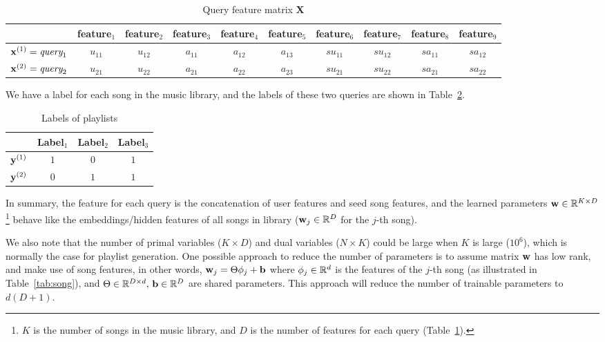 \begin{table}[h!]
\centering
\begin{tabular}{l|cc|ccccccc} \hline \hline
& feature$_1$ & feature$_2$ & feature$_3$ & feature$_4$ & feature$_5$ & feature$_6$ & feature$_7$ & feature$_8$ & feature$_9$ \\ \hline
$\mathbf{x}^{({1})} = \textit{query}_1$
& $u_{11}$ & $u_{12}$ 
& $a_{11}$ & $a_{12}$ & $a_{13}$ & $su_{11}$ & $su_{12}$ & $sa_{11}$ & $sa_{12}$ \\
$\mathbf{x}^{({2})} = \textit{query}_2$ 
& $u_{21}$ & $u_{22}$ 
& $a_{21}$ & $a_{22}$ & $a_{23}$ & $su_{21}$ & $su_{22}$ & $sa_{21}$ & $sa_{22}$ \\ \hline
\end{tabular}
\caption{Query feature matrix $\mathbf{X}$}
\label{tab:trainx}
\end{table}

We have a label for each song in the music library, and the labels of these two queries are shown in Table~\ref{tab:trainy}.

\begin{table}[h!]
\centering
\begin{tabular}{l|ccc} \hline \hline
& Label$_1$ & Label$_2$ & Label$_3$ \\ \hline
$\mathbf{y}^{({1})}$ & $1$ & $0$ & $1$ \\
$\mathbf{y}^{({2})}$ & $0$ & $1$ & $1$ \\ \hline
\end{tabular}
\caption{Labels of playlists}
\label{tab:trainy}
\end{table}


In summary, the feature for each query is the concatenation of user features and seed song features,
and the learned parameters $\mathbf{w} \in \mathbb{R}^{K \times D}$\footnote{
$K$ is the number of songs in the music library, and $D$ is the number of features for each query (Table~\ref{tab:trainx}).} 
behave like the embeddings/hidden features of all songs in library ($\mathbf{w}_j \in \mathbb{R}^D$ for the $j$-th song).

We also note that the number of primal variables ($K \times D$) and dual variables ($N \times K$) could be large when
$K$ is large (\eg $10^6$), which is normally the case for playlist generation.
One possible approach to reduce the number of parameters is to assume matrix $\mathbf{w}$ has low rank, and make use of song features,
in other words, $\mathbf{w}_j = \Theta \phi_j + \mathbf{b}$ where $\phi_j \in \mathbb{R}^d$ is the features of the $j$-th song (as illustrated in Table~\ref{tab:song}),
and $\Theta \in \mathbb{R}^{D \times d}, \, \mathbf{b} \in \mathbb{R}^D$ are shared parameters. 
This approach will reduce the number of trainable parameters to $d(D+1)$.


